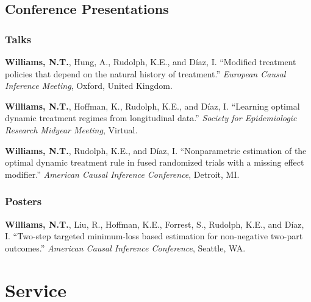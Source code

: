 \documentclass[12pt,letterpaper]{report}
\begin{document}
    \subsection*{Conference Presentations}
    
    \subsubsection{Talks}
    
    \begin{tablist}
    
    \item[2026]\tab \textbf{Williams, N.T.}, Hung, A., Rudolph, K.E., and Díaz, I. \enquote{Modified treatment policies that depend on the natural history of treatment.} \textit{European Causal Inference Meeting}, Oxford, United Kingdom.
    
     \item[2026] \tab \textbf{Williams, N.T.}, Hoffman, K., Rudolph, K.E., and Díaz, I. \enquote{Learning optimal dynamic treatment regimes from longitudinal data.} \textit{Society for Epidemiologic Research Midyear Meeting}, Virtual.
    
    \item[2025] \tab \textbf{Williams, N.T.}, Rudolph, K.E., and Díaz, I. \enquote{Nonparametric estimation of the optimal dynamic treatment rule in fused randomized trials with a missing effect modifier.} \textit{American Causal Inference Conference}, Detroit, MI.
    
    \end{tablist}
    
    \subsubsection{Posters}

    \begin{tablist}
    
    \item[2024] \tab \textbf{Williams, N.T.}, Liu, R., Hoffman, K.E., Forrest, S., Rudolph, K.E., and Díaz, I. \enquote{Two-step targeted minimum-loss based estimation for non-negative two-part outcomes.} \textit{American Causal Inference Conference}, Seattle, WA.

    \end{tablist}
    
    \section*{Service}
    
\end{document}
